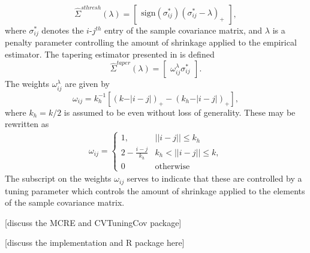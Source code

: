 \documentclass[12pt]{article}
\theoremstyle{definition}
\begin{document}
\[
\hat{\Sigma}^{sthresh}\left(\lambda\right) =   \begin{bmatrix} \mbox{sign}\left(\sigma^*_{ij}\right) \left(\sigma^*_{ij} - \lambda\right)_+ \end{bmatrix},
\]
\noindent 
where $\sigma^*_{ij}$ denotes the $i$-$j^{th}$ entry of the sample covariance matrix, and $\lambda$ is a penalty parameter controlling the amount of shrinkage applied to the empirical estimator. The tapering estimator presented in \citet{cai2010optimal} is defined
\[
\hat{\Sigma}^{taper}\left(\lambda\right) =  \begin{bmatrix} \omega_{ij}^\lambda \sigma^*_{ij} \end{bmatrix}.
\]
\noindent
The weights $\omega_{ij}^\lambda$ are given by 
\begin{equation*}
\omega_{ij} = k_h^{-1} \left[ \left( k - \vert i-j\vert\right)_+ - \left(k_h - \vert i-j\vert\right)_+ \right],
\end{equation*}
\noindent
where $k_h = k/2$ is assumed to be even without loss of generality. These may be rewritten as
\begin{align*}
\omega_{ij} = \left\{\begin{array}{ll} 1, & \vert \vert i -j \vert \vert \le k_h \\
                             2 - \frac{i - j}{k_h} & k_h < \vert \vert i -j \vert \vert \le k, \\
                             0 & \mbox{otherwise}  \end{array} \right.
\end{align*}
\noindent
The subscript on the weights $\omega_{ij}$ serves to indicate that these are controlled by a tuning parameter which controls the amount of shrinkage applied to the elements of the sample covariance matrix.

[discuss the MCRE and CVTuningCov package]

\bigskip

[discuss the implementation and R package here]
\end{document}

